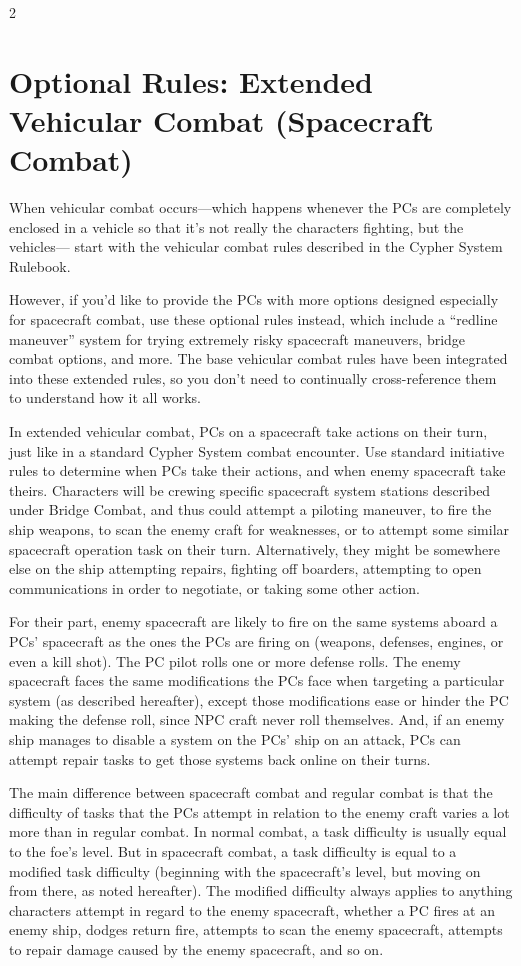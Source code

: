 \begin{multicols}{2}

\chapter{Optional Rules: Extended Vehicular Combat (Spacecraft Combat)}

When vehicular combat occurs—which happens whenever the PCs are completely enclosed in a vehicle so that it’s not really the characters fighting, but the vehicles— start with the vehicular combat rules described in the Cypher System Rulebook. 

However, if you’d like to provide the PCs with more options designed especially for spacecraft combat, use these optional rules instead, which include a “redline maneuver” system for trying extremely risky spacecraft maneuvers, bridge combat options, and more. The base vehicular combat rules have been integrated into these extended rules, so you don’t need to continually cross-reference them to understand how it all works.

In extended vehicular combat, PCs on a spacecraft take actions on their turn, just like in a standard Cypher System combat encounter. Use standard initiative rules to determine when PCs take their actions, and when enemy spacecraft take theirs. Characters will be crewing specific spacecraft system stations described under Bridge Combat, and thus could attempt a piloting maneuver, to fire the ship weapons, to scan the enemy craft for weaknesses, or to attempt some similar spacecraft operation task on their turn. Alternatively, they might be somewhere else on the ship attempting repairs, fighting off boarders, attempting to open communications in order to negotiate, or taking some other action. 

For their part, enemy spacecraft are likely to fire on the same systems aboard a PCs’ spacecraft as the ones the PCs are firing on (weapons, defenses, engines, or even a kill shot). The PC pilot rolls one or more defense rolls. The enemy spacecraft faces the same modifications the PCs face when targeting a particular system (as described hereafter), except those modifications ease or hinder the PC making the defense roll, since NPC craft never roll themselves. And, if an enemy ship manages to disable a system on the PCs’ ship on an attack, PCs can attempt repair tasks to get those systems back online on their turns. 

The main difference between spacecraft combat and regular combat is that the difficulty of tasks that the PCs attempt in relation to the enemy craft varies a lot more than in regular combat. In normal combat, a task difficulty is usually equal to the foe’s level. But in spacecraft combat, a task difficulty is equal to a modified task difficulty (beginning with the spacecraft’s level, but moving on from there, as noted hereafter). The modified difficulty always applies to anything characters attempt in regard to the enemy spacecraft, whether a PC fires at an enemy ship, dodges return fire, attempts to scan the enemy spacecraft, attempts to repair damage caused by the enemy spacecraft, and so on.


\end{multicols}
